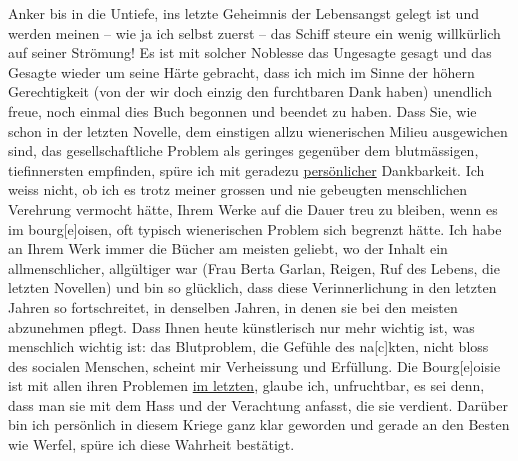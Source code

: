                Anker bis in die Untiefe, ins letzte Geheimnis der Lebensangst gelegt ist und werden
               meinen – wie ja ich selbst zuerst – das Schiff steure ein wenig willkürlich auf
               seiner Strömung! Es ist mit solcher Noblesse das Ungesagte gesagt und das Gesagte
               wieder um seine Härte gebracht, dass ich mich im Sinne der höhern Gerechtigkeit (von
               der wir doch einzig den furchtbaren Dank haben) unendlich freue, noch einmal dies Buch begonnen und beendet zu
               haben. Dass Sie, wie schon in der letzten Novelle, dem einsti{\pb}gen allzu wienerischen Milieu ausgewichen sind, das gesellschaftliche Problem als
               geringes gegenüber dem blutmässigen, tiefinnersten empfinden, spüre ich mit geradezu
                  \uline{persönlicher} Dankbarkeit. Ich weiss nicht, ob ich
               es trotz meiner grossen und nie gebeugten menschlichen Verehrung vermocht hätte,
               Ihrem Werke auf die Dauer treu zu bleiben, wenn es im
               bourg{[}e{]}oisen, oft typisch wienerischen Problem sich begrenzt hätte. Ich habe an Ihrem Werk immer die
               Bücher am meisten geliebt, wo der Inhalt ein allmenschlicher, allgültiger war (Frau Berta Garlan, Reigen, Ruf des Lebens,
               die letzten Novellen) und
               bin so glücklich, dass diese Verinnerlichung {\pb}in den letzten Jahren so fortschreitet,
               in denselben Jahren, in denen sie bei den meisten abzunehmen pflegt. Dass Ihnen heute
               künstlerisch nur mehr wichtig ist, was \strikeout{\textcolor{gray}{all}} menschlich wichtig ist: das Blutproblem, die
               Gefühle des na{[}c{]}kten, nicht bloss des socialen Menschen\introOben{}, scheint mir Verheissung und Erfüllung\introOben{}. Die
                  Bourg{[}e{]}oisie ist mit allen ihren Problemen \uline{im letzten}, glaube ich, unfruchtbar, es sei denn, dass
               man sie mit dem Hass und der Verachtung anfasst, die sie verdient. Darüber bin ich
               persönlich in diesem Kriege ganz klar geworden und gerade an den Besten wie Werfel, spüre ich diese Wahrheit bestätigt.\pend
           
